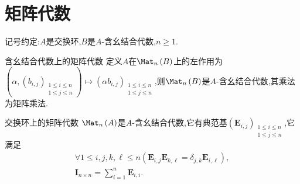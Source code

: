 \section{矩阵代数}

记号约定:$A$是交换环,$B$是$A$-含幺结合代数,$n\geq 1$.

\begin{proposition}{含幺结合代数上的矩阵代数}{}
	定义$A$在$\Mat_{n}\left(B\right)$上的左作用为$\left(\alpha,\left(b_{i,j}\right)_{\substack{1\leq i\leq n\\ 1\leq j\leq n}}\right)\mapsto\left(\alpha b_{i,j}\right)_{\substack{1\leq i\leq n\\ 1\leq j\leq n}}$,则$\Mat_{n}\left(B\right)$是$A$-含幺结合代数,其乘法为矩阵乘法.
\end{proposition}

\begin{corollary}{交换环上的矩阵代数}{}
	$\Mat_{n}\left(A\right)$是$A$-含幺结合代数,它有典范基$\left(\boldsymbol{E}_{i,j}\right)_{\substack{1\leq i\leq n\\ 1\leq j\leq n}}$,它满足
	\begin{gather*}
		\forall 1\leq i,j,k,\ell\leq n\left(\boldsymbol{E}_{i,j}\boldsymbol{E}_{k,\ell}=\delta_{j,k}\boldsymbol{E}_{i,\ell}\right),\\
		\boldsymbol{I}_{n\times n}=\sum\limits_{i=1}^{n}\boldsymbol{E}_{i,i}.
	\end{gather*}
\end{corollary}









